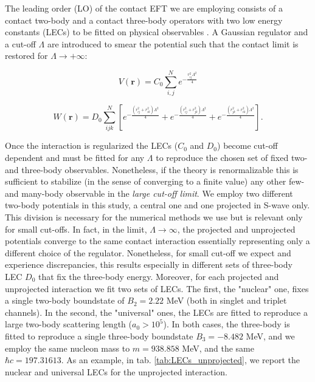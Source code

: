 \documentclass[aps,onecolumn,preprintnumbers,amsmath,amssymb,nofootinbib,superscriptaddress,notitlepage]{revtex4-1}
\begin{document}
The leading order (LO) of the contact EFT we are employing consists of a contact two-body and a contact three-body operators with two low energy constants (LECs) to be fitted on physical observables \cite{vanKolck:1999mw}. 
A Gaussian regulator and a cut-off $\Lambda$ are introduced to smear the potential such that the contact limit is restored for $\Lambda\rightarrow+\infty$: 

\begin{equation}
    V(\textbf{r})=C_0 \sum_{i,j}^N e^{-\frac{r_{ij}^2\Lambda^2}{4}}
\end{equation}

\begin{equation}
    W(\textbf{r})=D_0 \sum_{ijk}^N \left[
    e^{-\frac{(r_{ij}^2+r_{ik}^2)\Lambda^2}{4}}+
    e^{-\frac{(r_{ij}^2+r_{jk}^2)\Lambda^2}{4}}+
    e^{-\frac{(r_{jk}^2+r_{ik}^2)\Lambda^2}{4}}\right].
\end{equation}

Once the interaction is regularized the LECs ($C_0$ and $D_0$) become cut-off dependent and must be fitted for any $\Lambda$ to reproduce the chosen set of fixed two- and three-body observables.
Nonetheless, if the theory is renormalizable this is sufficient to stabilize (in the sense of converging to a finite value) any other few- and many-body observable in the \textit{large cut-off limit}.
We employ two different two-body potentials in this study, a central one and one projected in S-wave only. 
This division is necessary for the numerical methods we use but is relevant only for small cut-offs.
In fact, in the limit, $\Lambda\rightarrow\infty$, the projected and unprojected potentials converge to the same contact interaction essentially representing only a different choice of the regulator.
Nonetheless, for small cut-off we expect and experience discrepancies, this results especially in different sets of three-body LEC $D_0$ that fix the three-body energy.
Moreover, for each projected and unprojected interaction we fit two sets of LECs.
The first, the "nuclear" one, fixes a single two-body boundstate of $B_2=2.22$ MeV (both in singlet and triplet channels).
In the second, the "universal" ones, the LECs are fitted to reproduce a large two-body scattering length ($a_0>10^5$).
In both cases, the three-body is fitted to reproduce a single three-body boundstate $B_3=-8.482$ MeV, and we employ the same nucleon mass to $m=938.858$ MeV, and the same $\hbar c= 197.31613$.
As an example, in tab. \ref{tab:LECs_unprojected}, we report the nuclear and universal LECs for the unprojected interaction.
%
\end{document}
